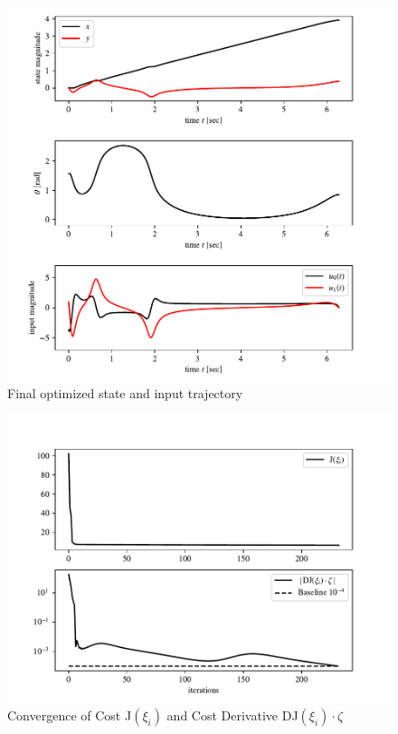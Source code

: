 \begin{figure}[h]
    \centering
    \includegraphics[width=\textwidth]{optimized.pdf}
    \centering
    \caption{Final optimized state and input trajectory}
\end{figure}
\begin{figure}[h]
    \centering
    \includegraphics[width=\textwidth]{convergence.pdf}
    \centering
    \caption{Convergence of Cost J$(\xi_i)$ and Cost Derivative DJ$(\xi_i)\cdot\zeta$}
\end{figure}